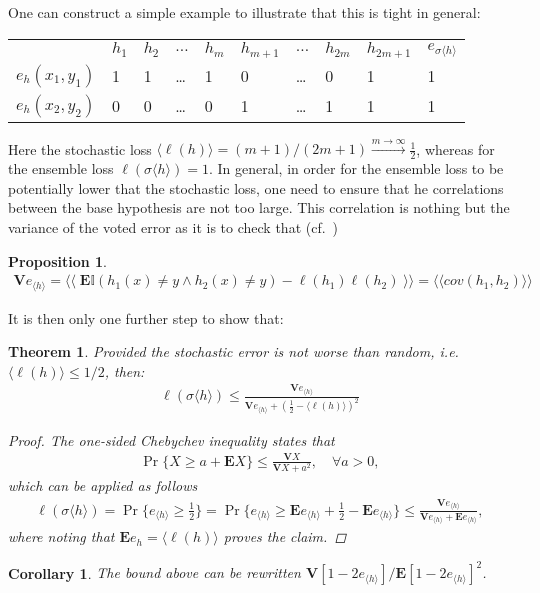 \documentclass[10pt,a4paper]{article}
\newtheorem{theorem}{Theorem}
\newtheorem{proposition}{Proposition}
\newtheorem{corollary}{Corollary}
\newcommand{\E}{{\mathbf{E}}}
\newcommand{\lh}{{\langle h \rangle}}
\begin{document}
\noindent One can construct a simple example to illustrate that this is tight in general: \\
\begin{center}
\begin{tabular}{llllllllll}
			 & $h_1$ & $h_2$ & $\dots$ & $h_m $& $h_{m+1}$ & $ \dots$ &  $h_{2m}$ & $h_ {2m+1}$ & $e_{\sigma \langle h \rangle}$\\
$e_h(x_1,y_1)$ & 1 & 1& \dots & 1& 0 & \dots & 0 & 1 & 1\\
$e_h(x_2,y_2)$ & 0 & 0& \dots & 0& 1 & \dots & 1 & 1 & 1
\end{tabular}
\end{center}
Here the stochastic loss $\langle \ell(h) \rangle = (m+1)/(2m+1) \stackrel{m\to \infty} \to \frac 12$, whereas for the ensemble loss $\ell(\sigma \langle h \rangle)=1$. In general, in order for the ensemble loss to be potentially lower that the stochastic loss, one need to ensure that he correlations  between the base hypothesis are not too large. This correlation is nothing but the variance of the voted error as it is to check that (cf.~\cite[Eq.~6]{lacasse2007pac})
\begin{proposition} 
\begin{align}
\mathbf V e_{\langle h \rangle} = \langle \langle\;  \E \mathbb I(h_1(x) \neq y \wedge h_2(x) \neq y) - \ell(h_1) \ell(h_2) \; \rangle \rangle 
= \langle \langle cov(h_1,h_2) \rangle \rangle
\end{align}
\end{proposition}
\noindent It is then only one further step to show that:
\begin{theorem} Provided the stochastic error is not worse than random, i.e.~$\langle \ell(h) \rangle \le 1/2$, then:
\begin{align}
\ell(\sigma \langle h \rangle) \le \frac{\mathbf V e_{\langle h \rangle} }{\mathbf V e_{\langle h \rangle}  + \left( \tfrac 12 - \langle \ell(h) \rangle \right)^2}
\end{align}
\begin{proof}
The one-sided Chebychev inequality states that
\begin{align}
\Pr\{X \geq a + \E X\} \le \frac{\mathbf VX}{\mathbf VX + a^2}, \quad \forall a>0,
\end{align}
which can be applied as follows
\begin{align}
\ell(\sigma \lh) =  \Pr \{ e_{\lh} \ge \tfrac 12 \} = \Pr \{ e_{\lh} \ge \E e_{\lh} + \tfrac 12 - \E e_\lh\}  \le \frac{\mathbf V e_{\lh}}{\mathbf V e_{\lh} + \E e_\lh},
\end{align}
where noting that $\E e_h = \langle \ell(h) \rangle$ proves the claim.
\end{proof}
\end{theorem}
\begin{corollary}
The bound above can be rewritten $\mathbf V[1-2 e_{\lh}] / \E[1-2 e_{\lh}]^2$. \cite{lacasse2007pac}
\end{corollary}
\end{document}
